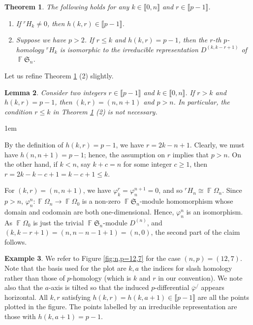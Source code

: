 \documentclass[a4paper]{amsart}
\makeatletter
\numberwithin{equation}{subsection}
\newtheorem{theorem}{Theorem}[section]
\newtheorem{lemma}[theorem]{Lemma}
\theoremstyle{definition}
\newtheorem{example}[theorem]{Example}
\DeclareMathOperator{\F}{\mathbb{F}}
\newcommand{\interval}[1]{\llbracket #1 \rrbracket}
\renewenvironment{proof}[1][\proofname]{\par
	\pushQED{\qed}%
	\normalfont \topsep0\p@\@plus6\p@ \labelsep1em\relax
	\trivlist
	\item[\hskip\labelsep\bfseries #1]\ignorespaces
	\mbox{}%
}{
	\popQED\endtrivlist\@endpefalse
}
\numberwithin{equation}{subsection}
\makeatother
\begin{document}
\begin{theorem}\label{thm:BJS}
The following holds for any $k\in\interval{0,n}$ and $r\in\interval{p-1}$.
\begin{enumerate}
\item {\rm \cite[Theorem 3.2]{BJS}} If ${}^{r}H_k\neq 0$, then $h(k,r)\in\interval{p-1}$.
\item {\rm \cite[Theorem 6.5]{BJS}} Suppose we have $p>2$.  If $r\leq k$ and $h(k,r)=p-1$, then the $r$-th $p$-homology ${}^{r}H_k$ is isomorphic to the irreducible representation $D^{(k,k-r+1)}$ of $\F\mathfrak{S}_n$.
\end{enumerate}
\end{theorem}

Let us refine Theorem \ref{thm:BJS} (2) slightly.
\begin{lemma}\label{BJS-supplement}
Consider two integers $r\in\interval{p-1}$ and $k\in\interval{0,n}$.
If $r>k$ and $h(k,r)=p-1$, then $(k,r)=(n,n+1)$ and $p>n$.
In particular, the condition $r\leq k$ in Theorem \ref{thm:BJS} (2) is not necessary.
\end{lemma}
\begin{proof}
By the definition of $h(k,r)=p-1$, we have $r=2k-n+1$.  Clearly, we must have $h(n,n+1)=p-1$; hence, the assumption on $r$ implies that $p>n$.  On the other hand, if $k<n$, say $k+c=n$ for some integer $c\geq 1$, then $r=2k-k-c+1 = k-c +1 \leq k$.

For $(k,r)=(n,n+1)$, we have $\varphi_k^r = \varphi_n^{n+1} = 0$, and so ${}^{r}H_n\cong \F\Omega_n$.  Since $p>n$, $\varphi_n^n:\F\Omega_n\to \F\Omega_0$ is a non-zero $\F\mathfrak{S}_n$-module homomorphism whose domain and codomain are both one-dimensional.  Hence, $\varphi_n^n$ is an isomorphism.  As $\F\Omega_0$ is just the trivial $\F\mathfrak{S}_n$-module $D^{(n)}$, and $(k,k-r+1)= (n,n-n-1+1)=(n,0)$, the second part of the claim follows.
\end{proof}

\begin{example}
We refer to Figure \ref{fig:n,p=12,7} for the case $(n,p)=(12,7)$.
Note that the basis used for the plot are $k,a$ the indices for slash homology rather than those of $p$-homology (which is $k$ and $r$ in our convention).  We note also that the $a$-axis is tilted so that the induced $p$-differential $\overline{\varphi}^\slash$ appears horizontal.  All $k,r$ satisfying $h(k,r)=h(k,a+1)\in \interval{p-1}$ are all the points plotted in the figure.  The points labelled by an irreducible representation are those with $h(k,a+1)=p-1$.
\end{example}
\end{document}
